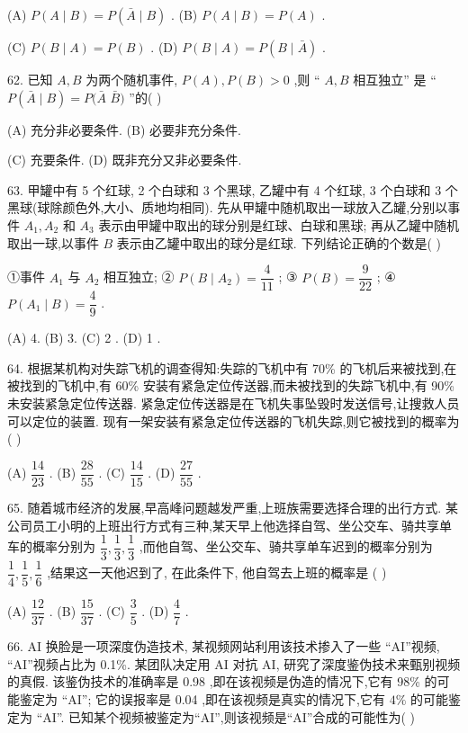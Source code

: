 (A) $P\left( {A \mid  B}\right)  = P\left( {\bar{A} \mid  B}\right)$ . (B) $P\left( {A \mid  B}\right)  = P\left( A\right)$ .

(C) $P\left( {B \mid  A}\right)  = P\left( B\right)$ . (D) $P\left( {B \mid  A}\right)  = P\left( {B \mid  \bar{A}}\right)$ .

62. 已知 $A,B$ 为两个随机事件, $P\left( A\right) ,P\left( B\right)  > 0$ ,则 “ $A,B$ 相互独立” 是 “ $P\left( {\bar{A} \mid  B}\right)  = P(\bar{A}$  $\bar{B})$ ”的(   )

(A) 充分非必要条件. (B) 必要非充分条件.

(C) 充要条件. (D) 既非充分又非必要条件.

63. 甲罐中有 5 个红球, 2 个白球和 3 个黑球, 乙罐中有 4 个红球, 3 个白球和 3 个黑球(球除颜色外,大小、质地均相同). 先从甲罐中随机取出一球放入乙罐,分别以事件 ${A}_{1},{A}_{2}$ 和 ${A}_{3}$ 表示由甲罐中取出的球分别是红球、白球和黑球; 再从乙罐中随机取出一球,以事件 $B$ 表示由乙罐中取出的球分是红球. 下列结论正确的个数是(   )

①事件 ${A}_{1}$ 与 ${A}_{2}$ 相互独立; ② $P\left( {B \mid  {A}_{2}}\right)  = \dfrac{4}{11}$ ; ③ $P\left( B\right)  = \dfrac{9}{22}$ ; ④ $P\left( {{A}_{1} \mid  B}\right)  = \dfrac{4}{9}$ .

(A) 4. (B) 3. (C) 2 . (D) 1 .

64. 根据某机构对失踪飞机的调查得知:失踪的飞机中有 70\% 的飞机后来被找到,在被找到的飞机中,有 60\% 安装有紧急定位传送器,而未被找到的失踪飞机中,有 90\% 未安装紧急定位传送器. 紧急定位传送器是在飞机失事坠毁时发送信号,让搜救人员可以定位的装置. 现有一架安装有紧急定位传送器的飞机失踪,则它被找到的概率为(   )

(A) $\dfrac{14}{23}$ . (B) $\dfrac{28}{55}$ . (C) $\dfrac{14}{15}$ . (D) $\dfrac{27}{55}$ .

65. 随着城市经济的发展,早高峰问题越发严重,上班族需要选择合理的出行方式. 某公司员工小明的上班出行方式有三种,某天早上他选择自驾、坐公交车、骑共享单车的概率分别为 $\dfrac{1}{3},\dfrac{1}{3},\dfrac{1}{3}$ ,而他自驾、坐公交车、骑共享单车迟到的概率分别为 $\dfrac{1}{4},\dfrac{1}{5},\dfrac{1}{6}$ ,结果这一天他迟到了, 在此条件下, 他自驾去上班的概率是 (   )

(A) $\dfrac{12}{37}$ . (B) $\dfrac{15}{37}$ . (C) $\dfrac{3}{5}$ . (D) $\dfrac{4}{7}$ .

66. AI 换脸是一项深度伪造技术, 某视频网站利用该技术掺入了一些 “AI”视频, “AI”视频占比为 0.1\%. 某团队决定用 AI 对抗 AI, 研究了深度鉴伪技术来甄别视频的真假. 该鉴伪技术的准确率是 0.98 ,即在该视频是伪造的情况下,它有 98\% 的可能鉴定为 “AI”; 它的误报率是 0.04 ,即在该视频是真实的情况下,它有 $4\%$ 的可能鉴定为 “AI”. 已知某个视频被鉴定为“AI”,则该视频是“AI”合成的可能性为(   )

